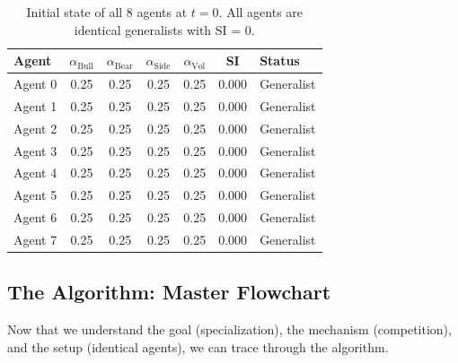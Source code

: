 \begin{table}[h]
\centering
\small
\caption{Initial state of all 8 agents at $t=0$. All agents are identical generalists with SI = 0.}
\begin{tabular}{l|cccc|c|l}
\toprule
\textbf{Agent} & $\alpha_{\text{Bull}}$ & $\alpha_{\text{Bear}}$ & $\alpha_{\text{Side}}$ & $\alpha_{\text{Vol}}$ & \textbf{SI} & \textbf{Status} \\
\midrule
Agent 0 & 0.25 & 0.25 & 0.25 & 0.25 & 0.000 & Generalist \\
Agent 1 & 0.25 & 0.25 & 0.25 & 0.25 & 0.000 & Generalist \\
Agent 2 & 0.25 & 0.25 & 0.25 & 0.25 & 0.000 & Generalist \\
Agent 3 & 0.25 & 0.25 & 0.25 & 0.25 & 0.000 & Generalist \\
Agent 4 & 0.25 & 0.25 & 0.25 & 0.25 & 0.000 & Generalist \\
Agent 5 & 0.25 & 0.25 & 0.25 & 0.25 & 0.000 & Generalist \\
Agent 6 & 0.25 & 0.25 & 0.25 & 0.25 & 0.000 & Generalist \\
Agent 7 & 0.25 & 0.25 & 0.25 & 0.25 & 0.000 & Generalist \\
\bottomrule
\end{tabular}
\label{tab:init}
\end{table}


\subsection{The Algorithm: Master Flowchart}

Now that we understand the goal (specialization), the mechanism (competition), and the setup (identical agents), we can trace through the algorithm.

